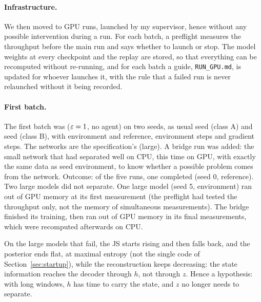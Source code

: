 \documentclass[10pt]{article}
\begin{document}
\paragraph{Infrastructure.}
We then moved to GPU runs, launched by my supervisor, hence without any possible intervention during a run.
For each batch, a preflight measures the throughput before the main run and says whether to launch or stop.
The model weights at every checkpoint and the replay are stored, so that everything can be recomputed without re-running,
and for each batch a guide, \texttt{RUN\_GPU.md}, is updated for whoever launches it, with the rule that a failed run is
never relaunched without it being recorded.

\paragraph{First batch.}
The first batch was \EThreeZero{} ($\varepsilon = 1$, no agent) on two seeds, as usual seed
\eThreeZeroSeedA{} (class A) and seed \eThreeZeroSeedB{} (class B), with environment and reference, \eThreeZeroEnvSteps{}
environment steps and \eThreeZeroGradSteps{} gradient steps.
The networks are the specification's (large).
A bridge run was added: the small network that had separated well on CPU, this time on GPU, with exactly the same data as
seed \eThreeZeroSeedA{} environment, to know whether a possible problem comes from the network.
Outcome: of the five runs, one completed (seed 0, reference). Two large models did not separate. One large model (seed %
5, environment) ran out of GPU memory at its first measurement (the preflight had tested the throughput only, not the %
memory of simultaneous measurements). The bridge finished its training, then ran out of GPU memory in its final
measurements, which were recomputed afterwards on CPU.

On the large models that fail, the JS starts rising and then falls back, and the posterior ends flat, at maximal entropy
(not the single code of Section~\ref{sec:startup}), while the reconstruction keeps decreasing: the state information
reaches the decoder through $h$, not through $z$.
Hence a hypothesis: with long windows, $h$ has time to carry the state, and $z$ no longer needs to separate.
\end{document}
